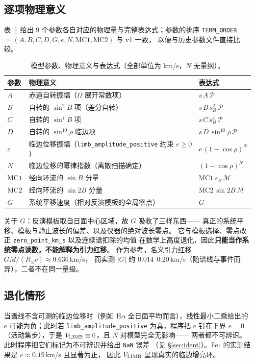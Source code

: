 \documentclass[11pt,a4paper]{ctexart}
\newcommand{\code}[1]{\texttt{\small #1}}
\newcommand{\Rsun}{R_{\odot}}
\newcommand{\Proj}{\mathcal{P}}
\newcommand{\Merid}{\mathcal{M}}
\begin{document}
\subsection{逐项物理意义}
表~\ref{tab:terms} 给出 9 个参数各自对应的物理量与完整表达式；参数的排序
\code{TERM\_ORDER}${}=(A,B,C,D,G,e,N,\mathrm{MC1},\mathrm{MC2})$ 与 v1 一致，
以便与历史参数文件直接比较。

\begin{table}[htbp]
\centering
\small
\caption{模型参数、物理意义与表达式（全部单位为 km/s，$N$ 无量纲）。}
\label{tab:terms}
\begin{tabular}{@{}lll@{}}
\toprule
参数 & 物理意义 & 表达式 \\
\midrule
$A$ & 赤道自转振幅（$\Omega$ 展开常数项）
    & $s\,A\,\Proj$ \\
$B$ & 自转的 $\sin^2 B$ 项（差分自转）
    & $s\,B\,s_B^{2}\,\Proj$ \\
$C$ & 自转的 $\sin^4 B$ 项
    & $s\,C\,s_B^{4}\,\Proj$ \\
$D$ & 自转的 $\sin^{10}\!\rho$ 临边项
    & $s\,D\,\sin^{10}\!\rho\,\Proj$ \\
$e$ & 临边位移振幅（\code{limb\_amplitude\_positive} 约束 $e\ge0$）
    & $e\,(1-\cos\rho)^{N}$ \\
$N$ & 临边位移的幂律指数（离散扫描确定）
    & $(1-\cos\rho)^{N}$ \\
$\mathrm{MC1}$ & 经向环流的 $\sin B$ 分量
    & $\mathrm{MC1}\,s_B\,\Merid$ \\
$\mathrm{MC2}$ & 经向环流的 $\sin 2B$ 分量
    & $\mathrm{MC2}\,\sin 2B\,\Merid$ \\
$G$ & 系统平移速度（相对反演模板的全局零点）
    & $G$ \\
\bottomrule
\end{tabular}
\end{table}

\noindent
关于 $G$：反演模板取自日面中心区域，故 $G$ 吸收了三样东西——
真正的系统平移、模板与静止波长的偏差、以及仪器的绝对波长零点。
它与模板选择、零点改正 \code{zero\_point\_km\_s} 以及连续谱扣除的均值
在数学上高度退化，因此\textbf{只能当作系统零点读数，不能解释为引力红移}。
作为参考，名义引力红移 $GM/(\Rsun c) \approx 0.636$\,km/s，
而实测 $|G|$ 约 $0.014$–$0.20$\,km/s（随谱线与事件而异），二者不在同一量级。

\subsection{退化情形}
当谱线不含可测的临边位移时（例如 H$\alpha$ 全日面平均而言），线性最小二乘给出的
$e$ 可能为负；此时若 \code{limb\_amplitude\_positive} 为真，程序把 $e$ 钉在下界
$e=0$（活动集步），于是 $V_{\rm LIMB}\equiv0$，且 $N$ 对模型完全无影响——
两者都不可辨识。此时程序把它们标记为不可辨识并给出 \code{NaN} 误差
（见 \S\ref{sec:ident}）。Fe\,\textsc{i} 的实测结果是 $e\approx0.19$\,km/s 且显著为正，
因此 $V_{\rm LIMB}$ 呈现真实的临边增亮环。
\end{document}
